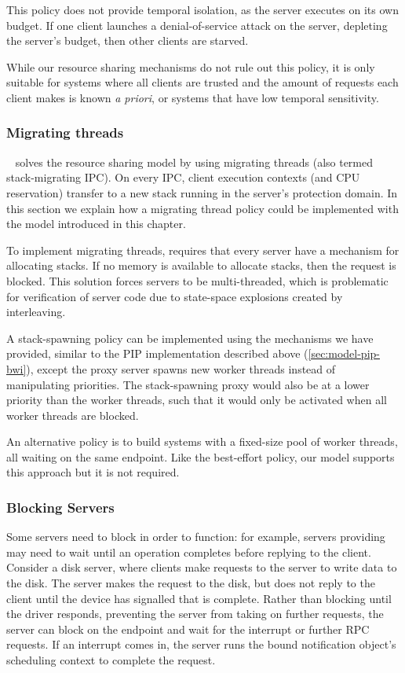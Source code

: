 This policy does not provide temporal isolation, as the server executes on its own budget.  If one
client launches a denial-of-service attack on the server, depleting the server's budget, then other
clients are starved. 

While our resource sharing mechanisms do not rule out this policy, it is only suitable for
systems where all clients are trusted and the amount of requests each client makes is known \emph{a
priori}, or systems that have low temporal sensitivity.

\subsubsection{Migrating threads}

\composite~\citep{Parmer_10} solves the resource sharing model by using migrating 
threads (also termed stack-migrating \gls{IPC}).
On every \gls{IPC}, client execution contexts (and CPU reservation) transfer to a new stack running in the
server's protection domain. In this section we explain how a migrating thread policy could be
implemented with the model introduced in this chapter.

To implement migrating threads, \composite requires that every server have a mechanism for
allocating stacks.  If no memory is available to allocate stacks, then the request is blocked.  This
solution forces servers to be multi-threaded, which is problematic for verification of server code 
due to state-space explosions created by interleaving. 

A stack-spawning policy can be implemented using the mechanisms we have provided, similar to
the \gls{PIP} implementation described above (\cref{sec:model-pip-bwi}), except the proxy
server spawns new worker threads instead of manipulating priorities. 
The stack-spawning proxy would also be at a lower priority than the worker threads, 
such that it would only be activated when all worker threads are blocked.

An alternative policy is to build systems with a fixed-size pool of worker threads, all waiting on the
same endpoint. 
Like the best-effort policy, our model supports this approach but it is not required.

\subsubsection{Blocking Servers}

Some servers need to block in order to function: for example, servers providing \IO may need to wait
until an operation completes before replying to the client. Consider a disk server, where
clients make requests to the server to write data to the disk. The server makes the request to the
disk, but does not reply to the client until the device has signalled that \IO is complete. Rather
than blocking until the driver responds, preventing the server from taking on further requests, the
server can block on the endpoint and wait for the interrupt or further \gls{RPC} requests. If an interrupt
comes in, the server runs the bound notification object's scheduling context to complete the
request.

